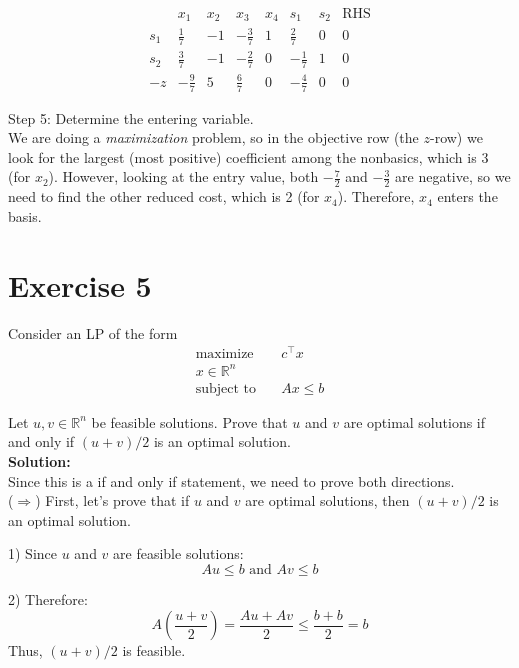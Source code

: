 \documentclass{article}
\begin{document}
\[
\begin{array}{c|cccccc|c}
  & x_1 & x_2 & x_3 & x_4 & s_1 & s_2 & \text{RHS}\\\hline
s_1 & \tfrac17 & -1 & -\tfrac37 & 1 & \tfrac27 & 0 & 0\\
s_2 & \tfrac37 & -1 & -\tfrac27 & 0 & -\tfrac17 & 1 & 0\\\hline
-z   & -\tfrac97       & 5         & \tfrac{6}{7}         & 0        & -\tfrac{4}{7} & 0 & 0
\end{array}
\]

Step 5: Determine the entering variable. \\

We are doing a \emph{maximization} problem, so in the objective row (the \(z\)-row) we look for the largest (most positive) coefficient among the nonbasics, which is \(3\) (for \(x_2\)).  However, looking at the entry value, both $-\frac{7}{2}$ and $-\frac{3}{2}$ are negative, so we need to find the other reduced cost, which is 2 (for \(x_4\)).  Therefore, \(x_4\) enters the basis.

\newpage

\section*{Exercise 5}
Consider an LP of the form
\begin{align*}
\text{maximize} \quad & c^\top x \\
x \in \mathbb{R}^n \\
\text{subject to} \quad & Ax \leq b
\end{align*}

Let $u, v \in \mathbb{R}^n$ be feasible solutions. Prove that $u$ and $v$ are optimal solutions if and only if $(u + v)/2$ is an optimal solution. \\

\textbf{Solution: } \\

Since this is a if and only if statement, we need to prove both directions. \\

($\Rightarrow$) First, let's prove that if $u$ and $v$ are optimal solutions, then $(u + v)/2$ is an optimal solution.

1) Since $u$ and $v$ are feasible solutions:
   \[ Au \leq b \text{ and } Av \leq b \]

2) Therefore:
   \[ A(\frac{u + v}{2}) = \frac{Au + Av}{2} \leq \frac{b + b}{2} = b \]
   Thus, $(u + v)/2$ is feasible.
\end{document}
